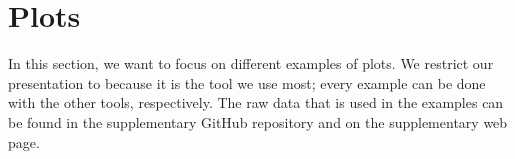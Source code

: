 \section{Plots}

In this section, we want to focus on different examples of plots.  We restrict
our presentation to  because it is the tool we use most;
every example can be done with the other tools, respectively.  The raw data that
is used in the examples can be found in the supplementary GitHub
repository and on the supplementary web
page.
